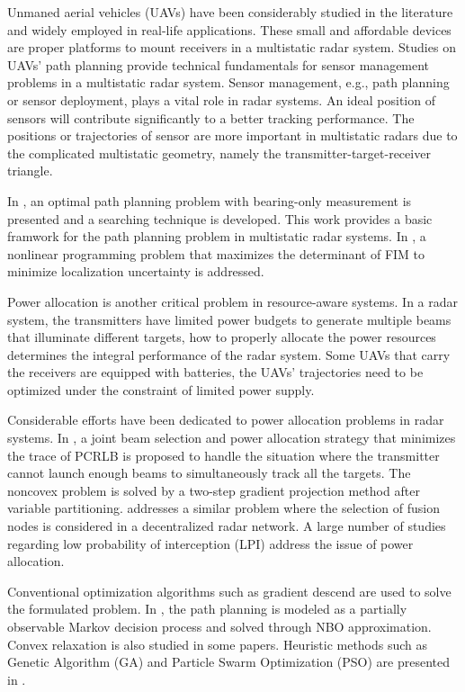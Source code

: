 \documentclass[12pt,journal,draftclsnofoot,onecolumn]{IEEEtran}
\begin{document}
Unmaned aerial vehicles (UAVs) have been considerably studied in the literature and widely employed in real-life applications\cite{pitre2012uav}. These small and affordable devices are proper platforms to mount receivers in a multistatic radar system. Studies on UAVs' path planning provide technical fundamentals for sensor management problems in a multistatic radar system. Sensor management, e.g., path planning or sensor deployment, plays a vital role in radar systems. An ideal position of sensors will contribute significantly to a better tracking performance. The positions or trajectories of sensor are more important in multistatic radars due to the complicated multistatic geometry, namely the transmitter-target-receiver triangle.

In \cite{hernandez2004optimal}, an optimal path planning problem with bearing-only measurement is presented and a searching technique is developed. This work provides a basic framwork for the path planning problem in multistatic radar systems. In \cite{dogancay2012uav}, a nonlinear programming problem that maximizes the determinant of FIM to minimize localization uncertainty is addressed.

Power allocation is another critical problem in resource-aware systems. In a radar system, the transmitters have limited power budgets to generate multiple beams that illuminate different targets, how to properly allocate the power resources determines the integral performance of the radar system. Some UAVs that carry the receivers are equipped with batteries, the UAVs' trajectories need to be optimized under the constraint of limited power supply.

Considerable efforts have been dedicated to power allocation problems in radar systems\cite{alirezaei2014optimum,lu2018adaptive}. In \cite{yan2016joint}, a joint beam selection and power allocation strategy that minimizes the trace of PCRLB is proposed to handle the situation where the transmitter cannot launch enough beams to simultaneously track all the targets. The noncovex problem is solved by a two-step gradient projection method after variable partitioning. \cite{xie2017joint} addresses a similar problem where the selection of fusion nodes is considered in a decentralized radar network. A large number of studies regarding low probability of interception (LPI) address the issue of power allocation\cite{she2016novel}\cite{godrich2011power}.


Conventional optimization algorithms such as gradient descend are used to solve the formulated problem\cite{bruna2017airborne}. In \cite{ragi2013uav}, the path planning is modeled as a partially observable Markov decision process and solved through NBO approximation. Convex relaxation is also studied in some papers\cite{xie2017joint}\cite{yan2016joint}. Heuristic methods such as Genetic Algorithm (GA) and Particle Swarm Optimization (PSO) are presented in \cite{roberge2012comparison}.
\end{document}
